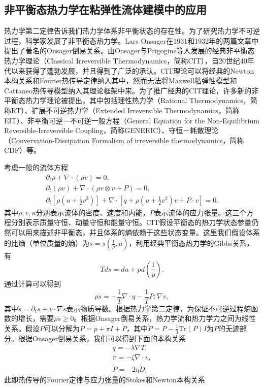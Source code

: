 \subsection{非平衡态热力学在粘弹性流体建模中的应用}
热力学第二定律告诉我们热力学体系非平衡状态的存在性。为了研究热力学不可逆过程，科学家发展了非平衡态热力学。Lars Onsager在1931和1932年的两篇文章中提出了著名的Onsager倒易关系\cite{onsager1931reciprocal,onsager1931reciprocalII}。由Onsager与Prigogine等人发展的经典非平衡态热力学理论（Classical Irreversible Thermodynamics，简称CIT），自20世纪40年代以来获得了蓬勃发展，并且得到了广泛的承认\cite{jou1996extended,truesdell2012rational}。CIT理论可以将经典的Newton本构关系和Fourier热传导定律纳入其中，然而无法将Maxwell粘弹性模型和Cattaneo热传导模型纳入其理论框架中来。为了推广经典的CIT理论，许多新的非平衡态热力学理论被提出，其中包括理性热力学（Rational Thermodynamics，简称RT）、扩展不可逆热力学（Extended Irreversible Thermodynamics，简称EIT）、非平衡可逆－不可逆一般方程（General Equation for the Non-Equilibrium Reversible-Irreversible Coupling，简称GENERIC）、守恒－耗散理论（Convervation-Dissipation Formalism of irreversible thermodynamics，简称CDF）等\cite{truesdell2012rational,jou1996extended,ottinger2005beyond,zhu2014conservation}。

考虑一般的流体方程
\begin{subequations} \label{eq:fluid}
	\begin{align}
		\partial_t \rho + \nabla \cdot (\rho v) = 0 ,\\
		\partial_t (\rho v) + \nabla \cdot (\rho v \otimes v + P) =  0, \\
		\partial_t[\rho (u + \frac{1}{2} v^2)] + \nabla \cdot [q + \rho (u+\frac{1}{2}v^2) v + P \cdot v] = 0.
	\end{align}
\end{subequations}
其中$\rho,v,u$分别表示流体的密度、速度和内能，$P$表示流体的应力张量。这三个方程分别表示质量守恒、动量守恒和能量守恒。CIT假设平衡态的热力学状态参量仍然可以用来描述非平衡态，并且体系的熵依赖于这些状态变量。这里我们假设体系的比熵（单位质量的熵）为$s=s(\frac{1}{\rho},u)$，利用经典平衡态热力学的Gibbs关系，有
\begin{equation*}
	T ds = du + p d(\frac{1}{\rho}).
\end{equation*}
通过计算可以得到
\begin{equation*}
	\rho \dot{s} = - \frac{1}{T} \nabla \cdot q - \frac{1}{T} P: \nabla v,
\end{equation*}
其中$\dot{s} = \partial_t s + v \cdot \nabla s$表示物质导数。根据热力学第二定律，为保证不可逆过程熵函数的增长，需要$\rho \dot{s} \ge 0 $。根据Onsager倒易关系，热力学流和热力学力之间为线性关系。假设$P$可以分解为$P = p + \pi I + \mathring{P}$，其中$\mathring{P} = P - \frac{1}{3} \mbox{Tr}(P) I$为$P$的无迹部分。根据Onsager倒易关系，我们可以得到下面的本构关系
\begin{eqnarray*}
	q = -\lambda \nabla T, \\
	\pi =  - \zeta \nabla \cdot v, \\
	\mathring{P} = - 2 \eta \mathring{D}.
\end{eqnarray*}
此即热传导的Fourier定律与应力张量的Stokes和Newton本构关系

